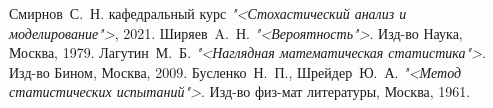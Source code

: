 \begin{thebibliography}{0}
     Смирнов~С.~Н. кафедральный курс 
        \emph{"<Стохастический анализ и моделирование">}, 2021.
     Ширяев~A.~Н. 
        \emph{"<Вероятность">}. Изд-во Наука, Москва, 1979.
     Лагутин~М.~Б.
        \emph{"<Наглядная математическая статистика">}. Изд-во Бином, Москва, 2009.
     Бусленко~Н.~П., Шрейдер~Ю.~А.
        \emph{"<Метод статистических испытаний">}. Изд-во физ-мат литературы, Москва, 1961.         
\end{thebibliography}